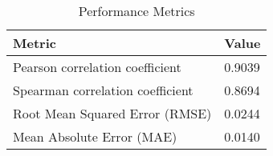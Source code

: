 \documentclass{article}
\begin{document}
\begin{table}[h!]
\centering
\begin{tabular}{ll}
\toprule
Metric & Value \\
\midrule
Pearson correlation coefficient & 0.9039 \\
Spearman correlation coefficient & 0.8694 \\
Root Mean Squared Error (RMSE) & 0.0244 \\
Mean Absolute Error (MAE) & 0.0140 \\
\bottomrule
\end{tabular}
\caption{Performance Metrics}
\label{tab:metrics}
\end{table}
\end{document}
